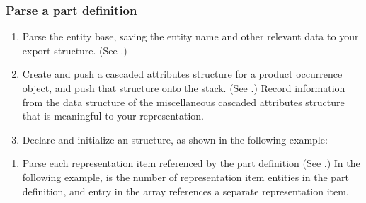 \documentclass[letterpaper,12pt,english,openany,oneside]{sphinxmanual}
\begin{document}
\subsubsection{Parse a part definition}
\label{\detokenize{Plugins_A3D_API:parse-a-part-definition}}\begin{enumerate}
%
\item {} 
Parse the entity base, saving the entity name and other relevant data to your export structure. (See .)

\item {} 
Create and push a cascaded attributes structure for a product occurrence object, and push that structure onto the stack. (See .) Record information from the data structure of the miscellaneous cascaded attributes structure that is meaningful to your representation.

\item {} 
Declare and initialize an  structure, as shown in the following example:

\end{enumerate}

\begin{sphinxVerbatim}[commandchars=\\\{\}]
 
   
\end{sphinxVerbatim}
\begin{enumerate}
%
\item {} 
Parse each representation item referenced by the part definition (See .) In the following example,  is the number of representation item entities in the part definition, and entry in the  array references a separate representation item.

\end{enumerate}
\end{document}
